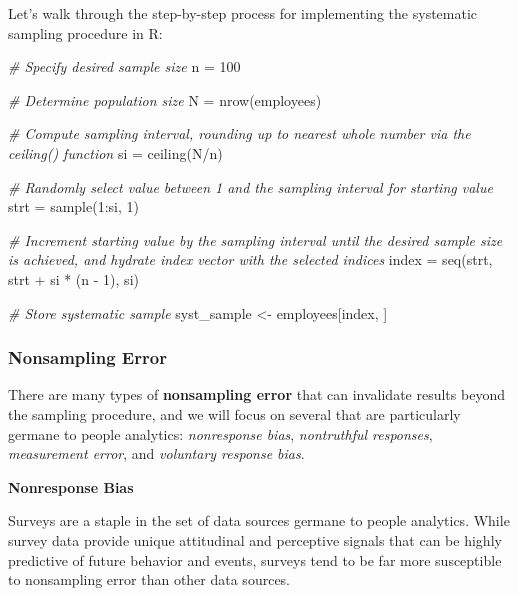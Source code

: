 \documentclass[
]{book}
\newenvironment{Shaded}{\begin{snugshade}}{\end{snugshade}}
\newcommand{\CommentTok}[1]{\textcolor[rgb]{0.56,0.35,0.01}{\textit{#1}}}
\newcommand{\DecValTok}[1]{\textcolor[rgb]{0.00,0.00,0.81}{#1}}
\newcommand{\FunctionTok}[1]{\textcolor[rgb]{0.00,0.00,0.00}{#1}}
\newcommand{\NormalTok}[1]{#1}
\newcommand{\OtherTok}[1]{\textcolor[rgb]{0.56,0.35,0.01}{#1}}
\newcommand{\SpecialCharTok}[1]{\textcolor[rgb]{0.00,0.00,0.00}{#1}}
\begin{document}
Let's walk through the step-by-step process for implementing the systematic sampling procedure in R:

\begin{Shaded}
\begin{Highlighting}[]
\CommentTok{\# Specify desired sample size}
\NormalTok{n }\OtherTok{=} \DecValTok{100}

\CommentTok{\# Determine population size}
\NormalTok{N }\OtherTok{=} \FunctionTok{nrow}\NormalTok{(employees)}

\CommentTok{\# Compute sampling interval, rounding up to nearest whole number via the ceiling() function}
\NormalTok{si }\OtherTok{=} \FunctionTok{ceiling}\NormalTok{(N}\SpecialCharTok{/}\NormalTok{n)}

\CommentTok{\# Randomly select value between 1 and the sampling interval for starting value}
\NormalTok{strt }\OtherTok{=} \FunctionTok{sample}\NormalTok{(}\DecValTok{1}\SpecialCharTok{:}\NormalTok{si, }\DecValTok{1}\NormalTok{)}

\CommentTok{\# Increment starting value by the sampling interval until the desired sample size is achieved, and hydrate index vector with the selected indices}
\NormalTok{index }\OtherTok{=} \FunctionTok{seq}\NormalTok{(strt, strt }\SpecialCharTok{+}\NormalTok{ si }\SpecialCharTok{*}\NormalTok{ (n }\SpecialCharTok{{-}} \DecValTok{1}\NormalTok{), si)}

\CommentTok{\# Store systematic sample}
\NormalTok{syst\_sample }\OtherTok{\textless{}{-}}\NormalTok{ employees[index, ]}
\end{Highlighting}
\end{Shaded}

\hypertarget{nonsampling-error}{%
\subsubsection{Nonsampling Error}\label{nonsampling-error}}

There are many types of \textbf{nonsampling error} that can invalidate results beyond the sampling procedure, and we will focus on several that are particularly germane to people analytics: \emph{nonresponse bias}, \emph{nontruthful responses}, \emph{measurement error}, and \emph{voluntary response bias}.

\textbf{Nonresponse Bias}

Surveys are a staple in the set of data sources germane to people analytics. While survey data provide unique attitudinal and perceptive signals that can be highly predictive of future behavior and events, surveys tend to be far more susceptible to nonsampling error than other data sources.
\end{document}
